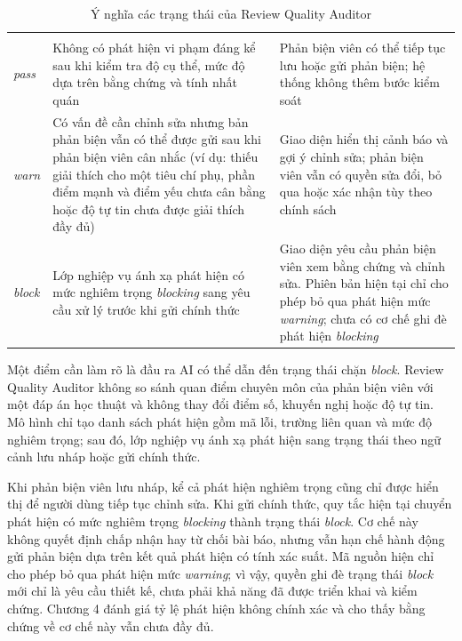\begingroup
\setlength{\tabcolsep}{2pt}
\renewcommand{\arraystretch}{1.15}
\begin{longtable}{|C{0.31\textwidth}|P{0.31\textwidth}|P{0.31\textwidth}|}
  \caption{Ý nghĩa các trạng thái của Review Quality Auditor}\label{tab:ch3-rqa-states}\\
  \hline
       &        &     \\ \hline
  \endfirsthead
  \hline
       &        &     \\ \hline
  \endhead
  \textit{pass}   &   Không có phát hiện vi phạm đáng kể sau khi kiểm tra độ cụ thể, mức độ dựa trên bằng chứng và tính nhất quán & Phản biện viên có thể tiếp tục lưu hoặc gửi phản biện; hệ thống không thêm bước kiểm soát \\ \hline
   \textit{warn}   &   Có vấn đề cần chỉnh sửa nhưng bản phản biện vẫn có thể được gửi sau khi phản biện viên cân nhắc (ví dụ: thiếu giải thích cho một tiêu chí phụ, phần điểm mạnh và điểm yếu chưa cân bằng hoặc độ tự tin chưa được giải thích đầy đủ)   &   Giao diện hiển thị cảnh báo và gợi ý chỉnh sửa; phản biện viên vẫn có quyền sửa đổi, bỏ qua hoặc xác nhận tùy theo chính sách \\ \hline
  \textit{block}   &   Lớp nghiệp vụ ánh xạ phát hiện có mức nghiêm trọng \textit{blocking} sang yêu cầu xử lý trước khi gửi chính thức  &  Giao diện yêu cầu phản biện viên xem bằng chứng và chỉnh sửa. Phiên bản hiện tại chỉ cho phép bỏ qua phát hiện mức \textit{warning}; chưa có cơ chế ghi đè phát hiện \textit{blocking} \\ \hline
\end{longtable}
\endgroup

Một điểm cần làm rõ là đầu ra AI có thể dẫn đến trạng thái chặn \textit{block}. Review Quality Auditor không so sánh quan điểm chuyên môn của phản biện viên với một đáp án học thuật và không thay đổi điểm số, khuyến nghị hoặc độ tự tin. Mô hình chỉ tạo danh sách phát hiện gồm mã lỗi, trường liên quan và mức độ nghiêm trọng; sau đó, lớp nghiệp vụ ánh xạ phát hiện sang trạng thái theo ngữ cảnh lưu nháp hoặc gửi chính thức.

Khi phản biện viên lưu nháp, kể cả phát hiện nghiêm trọng cũng chỉ được hiển thị để người dùng tiếp tục chỉnh sửa. Khi gửi chính thức, quy tắc hiện tại chuyển phát hiện có mức nghiêm trọng \textit{blocking} thành trạng thái \textit{block}. Cơ chế này không quyết định chấp nhận hay từ chối bài báo, nhưng vẫn hạn chế hành động gửi phản biện dựa trên kết quả phát hiện có tính xác suất. Mã nguồn hiện chỉ cho phép bỏ qua phát hiện mức \textit{warning}; vì vậy, quyền ghi đè trạng thái \textit{block} mới chỉ là yêu cầu thiết kế, chưa phải khả năng đã được triển khai và kiểm chứng. Chương 4 đánh giá tỷ lệ phát hiện không chính xác và cho thấy bằng chứng về cơ chế này vẫn chưa đầy đủ.

